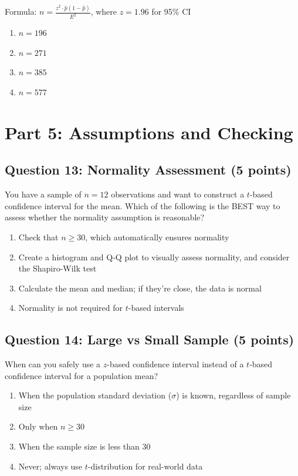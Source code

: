 \documentclass[11pt]{article}
\begin{document}
Formula: $n = \frac{z^2 \cdot \hat{p}(1-\hat{p})}{E^2}$, where $z = 1.96$ for 95\% CI

\begin{enumerate}[label=\alph*)]
\item $n = 196$
\item $n = 271$
\item $n = 385$
\item $n = 577$
\end{enumerate}

\section*{Part 5: Assumptions and Checking}

\subsection*{Question 13: Normality Assessment (5 points)}

You have a sample of $n = 12$ observations and want to construct a $t$-based confidence interval for the mean. Which of the following is the BEST way to assess whether the normality assumption is reasonable?

\begin{enumerate}[label=\alph*)]
\item Check that $n \geq 30$, which automatically ensures normality
\item Create a histogram and Q-Q plot to visually assess normality, and consider the Shapiro-Wilk test
\item Calculate the mean and median; if they're close, the data is normal
\item Normality is not required for $t$-based intervals
\end{enumerate}

\subsection*{Question 14: Large vs Small Sample (5 points)}

When can you safely use a $z$-based confidence interval instead of a $t$-based confidence interval for a population mean?

\begin{enumerate}[label=\alph*)]
\item When the population standard deviation ($\sigma$) is known, regardless of sample size
\item Only when $n \geq 30$
\item When the sample size is less than 30
\item Never; always use $t$-distribution for real-world data
\end{enumerate}
\end{document}
